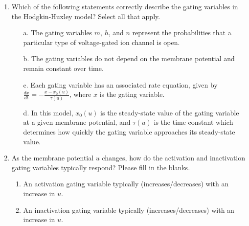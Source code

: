 \documentclass[11pt,letterpaper]{article}
\begin{document}
\begin{enumerate}
    \item Which of the following statements correctly describe the gating variables in the Hodgkin-Huxley model? Select all that apply.
    \begin{enumerate}
    \item [a.] The gating variables $m$, $h$, and $n$ represent the probabilities that a particular type of voltage-gated ion channel is open.
    \item [b.] The gating variables do not depend on the membrane potential and remain constant over time.
    \item [c.] Each gating variable has an associated rate equation, given by $\frac{dx}{dt} = -\frac{x - x_0(u)}{\tau(u)}$, where $x$ is the gating variable.
    \item [d.]  In this model, $x_0(u)$ is the steady-state value of the gating variable at a given membrane potential, and $\tau(u)$ is the time constant which determines how quickly the gating variable approaches its steady-state value.
    \end{enumerate} 

    \item As the membrane potential $u$ changes, how do the activation and inactivation gating variables typically respond? Please fill in the blanks.
    \begin{enumerate}
    \item An activation gating variable typically (increases/decreases) with an increase in $u$.
    \item An inactivation gating variable typically (increases/decreases) with an increase in $u$.
    \end{enumerate}
\end{enumerate}
\pagebreak
\end{document}
